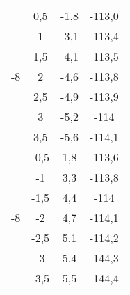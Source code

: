 \documentclass[11pt]{article}
\begin{document}
\begin{multicols}{2}
\begin{tabular}{|c|c|c|c|}
\multirow{7}{*}{-8} & 0,5 & -1,8 & -113,0 \\
& 1   & -3,1 & -113,4 \\
& 1,5 & -4,1 & -113,5 \\
& 2   & -4,6 & -113,8 \\
& 2,5 & -4,9 & -113,9 \\
& 3   & -5,2 & -114 \\
& 3,5 & -5,6 & -114,1 \\
\hline
\multirow{7}{*}{-8} & -0,5 & 1,8 & -113,6 \\
& -1   & 3,3 & -113,8 \\
& -1,5 & 4,4 & -114 \\
& -2   & 4,7 & -114,1 \\
& -2,5 & 5,1 & -114,2 \\
& -3   & 5,4 & -144,3 \\
& -3,5 & 5,5 & -144,4 \\
\hline

\end{tabular}

\end{multicols}
\end{document}
